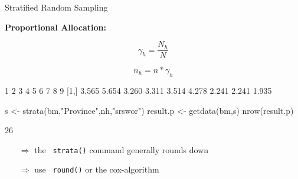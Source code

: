 \documentclass[11pt,german,hideothersubsections]{beamer}
\newcommand{\R}[1]{{\tt \color{blue}  #1}}
\begin{document}
\begin{frame}[fragile]{Stratified Random Sampling}
\vspace{-.35cm}
\footnotesize{
\begin{center}
\textbf{Proportional Allocation:}
\end{center}
\begin{equation*}
\gamma_{h}=\frac{N_h}{N}
\end{equation*}

\begin{equation*}
n_h=n*\gamma_{h}
\end{equation*}

\begin{Schunk}
\begin{Soutput}
           1     2     3     4     5     6     7     8     9
  [1,] 3.565 5.654 3.260 3.311 3.514 4.278 2.241 2.241 1.935
\end{Soutput}
\begin{Sinput}
 s <- strata(bm,"Province",nh,"srswor")
 result.p <- getdata(bm,s)
 nrow(result.p)
\end{Sinput}
\begin{Soutput}
[1] 26
\end{Soutput}
\end{Schunk}
\begin{itemize}
\item[$\Rightarrow$] the \R{strata()} command generally rounds down
\item[$\Rightarrow$] use \R{round()} or the cox-algorithm
\end{itemize}
}
\end{frame}
\end{document}
